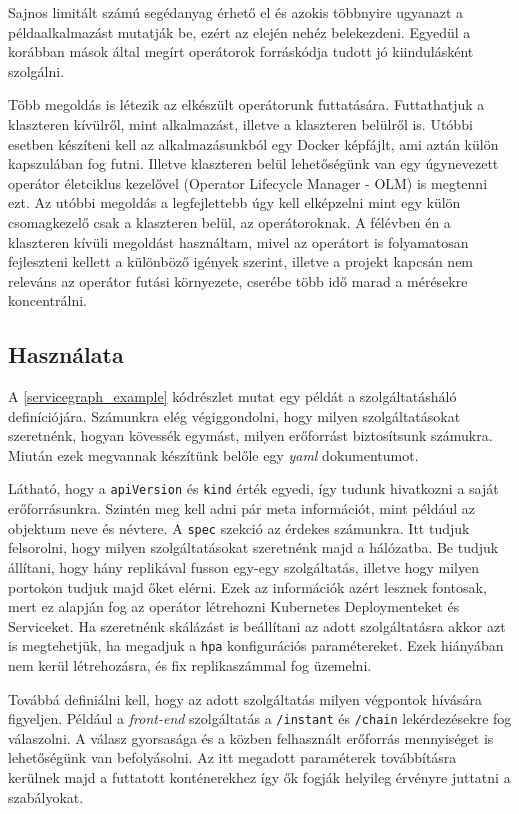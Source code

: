 Sajnos limitált számú segédanyag érhető el és azokis többnyire ugyanazt a példaalkalmazást mutatják be, ezért az elején nehéz belekezdeni. Egyedül a korábban mások által megírt operátorok forráskódja tudott jó kiindulásként szolgálni.

Több megoldás is létezik az elkészült operátorunk futtatására. Futtathatjuk a klaszteren kívülről, mint alkalmazást, illetve a klaszteren belülről is. Utóbbi esetben készíteni kell az alkalmazásunkból egy Docker képfájlt, ami aztán külön kapszulában fog futni. Illetve klaszteren belül lehetőségünk van egy úgynevezett operátor életciklus kezelővel (Operator Lifecycle Manager - OLM) is megtenni ezt. Az utóbbi megoldás a legfejlettebb úgy kell elképzelni mint egy külön csomagkezelő csak a klaszteren belül, az operátoroknak. A félévben én a klaszteren kívüli megoldást használtam, mivel az operátort is folyamatosan fejleszteni kellett a különböző igények szerint, illetve a projekt kapcsán nem releváns az operátor futási környezete, cserébe több idő marad a mérésekre koncentrálni.

\subsection{Használata}
A \ref{servicegraph_example} kódrészlet mutat egy példát a szolgáltatásháló definíciójára. Számunkra elég végiggondolni, hogy milyen szolgáltatásokat szeretnénk, hogyan kövessék egymást, milyen erőforrást biztosítsunk számukra. Miután ezek megvannak készítünk belőle egy \textit{yaml} dokumentumot.

Látható, hogy a \verb+apiVersion+ és \verb+kind+ érték egyedi, így tudunk hivatkozni a saját erőforrásunkra. Szintén meg kell adni pár meta információt, mint például az objektum neve és névtere. A \verb+spec+ szekció az érdekes számunkra. Itt tudjuk felsorolni, hogy milyen szolgáltatásokat szeretnénk majd a hálózatba. Be tudjuk állítani, hogy hány replikával fusson egy-egy szolgáltatás, illetve hogy milyen portokon tudjuk majd őket elérni. Ezek az információk azért lesznek fontosak, mert ez alapján fog az operátor létrehozni Kubernetes Deploymenteket és Serviceket. Ha szeretnénk skálázást is beállítani az adott szolgáltatásra akkor azt is megtehetjük, ha megadjuk a \verb+hpa+ konfigurációs paramétereket. Ezek hiányában nem kerül létrehozásra, és fix replikaszámmal fog üzemelni.

Továbbá definiálni kell, hogy az adott szolgáltatás milyen végpontok hívására figyeljen. Például a \textit{front-end} szolgáltatás a \verb+/instant+ és \verb+/chain+ lekérdezésekre fog válaszolni. A válasz gyorsasága és a közben felhasznált erőforrás mennyiséget is lehetőségünk van befolyásolni. Az itt megadott paraméterek továbbításra kerülnek majd a futtatott konténerekhez így ők fogják helyileg érvényre juttatni a szabályokat. 

